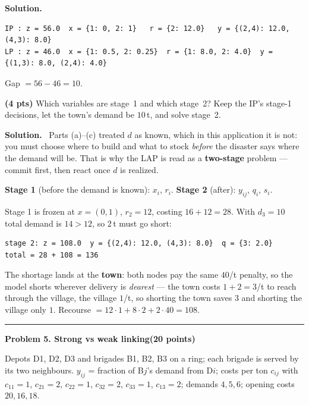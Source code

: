 \documentclass[10pt]{article}
\newcommand{\problem}[2]{%
  \par\bigskip
  {\color{ruleink}\rule{\textwidth}{1pt}}\par\nobreak\vspace{3pt}
  {\large\bfseries #2}\hfill{\normalsize\bfseries(#1 points)}\par\nobreak\vspace{4pt}}
\newenvironment{solution}
  {\par\smallskip\begingroup\color{solink}\textbf{Solution.}\ }
  {\endgroup\par}
\begin{document}
\begin{parts}
\begin{solution}
\begin{lstlisting}
IP : z = 56.0  x = {1: 0, 2: 1}   r = {2: 12.0}   y = {(2,4): 12.0, (4,3): 8.0}
LP : z = 46.0  x = {1: 0.5, 2: 0.25}  r = {1: 8.0, 2: 4.0}  y = {(1,3): 8.0, (2,4): 4.0}
\end{lstlisting}
Gap $= 56 - 46 = 10$.
\end{solution}

\item \textbf{(4 pts)} Which variables are stage~1 and which stage~2? Keep the IP's stage-1
  decisions, let the town's demand be $10$\,t, and solve stage~2.

\begin{solution}
Parts (a)--(c) treated $d$ as known, which in this application it is not: you must choose
where to build and what to stock \emph{before} the disaster says where the demand will be.
That is why the LAP is read as a \textbf{two-stage} problem --- commit first, then react once
$d$ is realized.
\vspace{2pt}

\textbf{Stage 1} (before the demand is known): $x_i$, $r_i$. \quad
\textbf{Stage 2} (after): $y_{ij}$, $q_i$, $s_i$.

Stage 1 is frozen at $x = (0,1)$, $r_2 = 12$, costing $16 + 12 = 28$. With $d_3 = 10$ total
demand is $14 > 12$, so $2$\,t must go short:
\begin{lstlisting}
stage 2: z = 108.0  y = {(2,4): 12.0, (4,3): 8.0}  q = {3: 2.0}
total = 28 + 108 = 136
\end{lstlisting}
The shortage lands at the \textbf{town}: both nodes pay the same $40$/t penalty, so the
model shorts wherever delivery is \emph{dearest} --- the town costs $1 + 2 = 3$/t to reach
through the village, the village $1$/t, so shorting the town saves $3$ and shorting the
village only $1$. Recourse $= 12 \cdot 1 + 8 \cdot 2 + 2 \cdot 40 = 108$.
\end{solution}
\end{parts}

\problem{20}{Problem 5. Strong vs weak linking}

Depots D1, D2, D3 and brigades B1, B2, B3 on a ring; each brigade is served by its two
neighbours. $y_{ij}$ = fraction of B$j$'s demand from D$i$; costs per ton $c_{ij}$ with
$c_{11} = 1$, $c_{21} = 2$, $c_{22} = 1$, $c_{32} = 2$, $c_{33} = 1$, $c_{13} = 2$;
demands $4, 5, 6$; opening costs $20, 16, 18$.
\end{document}
